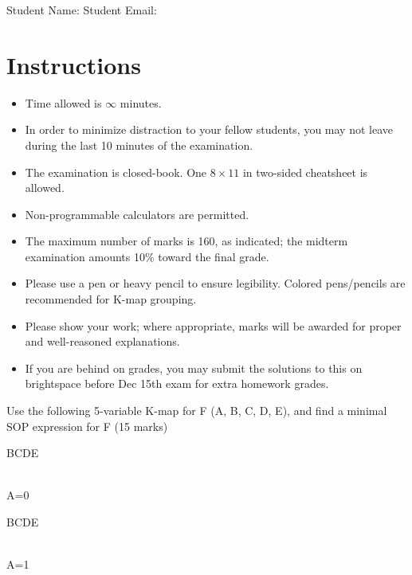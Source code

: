 \maketitle

Student Name: \hfill Student Email: \hspace{10em}
\section{Instructions}
\begin{itemize}
  \item Time allowed is $\infty$ minutes.
  \item In order to minimize distraction to your fellow students, you may not leave
  during the last 10 minutes of the examination.
  \item The examination is closed-book. One $8\times11$ in two-sided cheatsheet is allowed.
  \item Non-programmable calculators are permitted.
  \item The maximum number of marks is 160, as indicated; the midterm examination
  amounts 10\% toward the final grade.
  \item Please use a pen or heavy pencil to ensure legibility. Colored
    pens/pencils are recommended for K-map grouping.
  \item Please show your work; where appropriate, marks will be awarded for proper and well-reasoned explanations.
  \item If you are behind on grades, you may submit the solutions to this on brightspace before Dec 15th exam for extra homework grades.
\end{itemize}

\begin{prob}
Use the following 5-variable K-map for F (A, B, C, D, E), and find
  a minimal SOP expression for F (15 marks)\\
\begin{minipage}{0.5\linewidth}
  \centering
  \begin{Karnaugh}{BC}{DE}
  \end{Karnaugh}\\
  A=0
\end{minipage}%
\begin{minipage}{0.5\linewidth}
  \centering
  \begin{Karnaugh}{BC}{DE}
  \end{Karnaugh}\\
  A=1
\end{minipage}
\end{prob}


